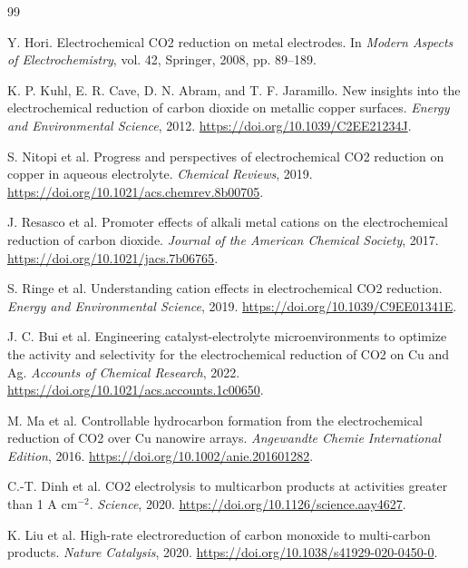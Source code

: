 \documentclass[11pt]{article}
\begin{document}
\begin{thebibliography}{99}

Y. Hori.
\newblock Electrochemical CO2 reduction on metal electrodes.
\newblock In \emph{Modern Aspects of Electrochemistry}, vol. 42, Springer, 2008, pp. 89--189.

K. P. Kuhl, E. R. Cave, D. N. Abram, and T. F. Jaramillo.
\newblock New insights into the electrochemical reduction of carbon dioxide on metallic copper surfaces.
\newblock \emph{Energy and Environmental Science}, 2012.
\newblock \url{https://doi.org/10.1039/C2EE21234J}.

S. Nitopi et al.
\newblock Progress and perspectives of electrochemical CO2 reduction on copper in aqueous electrolyte.
\newblock \emph{Chemical Reviews}, 2019.
\newblock \url{https://doi.org/10.1021/acs.chemrev.8b00705}.

J. Resasco et al.
\newblock Promoter effects of alkali metal cations on the electrochemical reduction of carbon dioxide.
\newblock \emph{Journal of the American Chemical Society}, 2017.
\newblock \url{https://doi.org/10.1021/jacs.7b06765}.

S. Ringe et al.
\newblock Understanding cation effects in electrochemical CO2 reduction.
\newblock \emph{Energy and Environmental Science}, 2019.
\newblock \url{https://doi.org/10.1039/C9EE01341E}.

J. C. Bui et al.
\newblock Engineering catalyst-electrolyte microenvironments to optimize the activity and selectivity for the electrochemical reduction of CO2 on Cu and Ag.
\newblock \emph{Accounts of Chemical Research}, 2022.
\newblock \url{https://doi.org/10.1021/acs.accounts.1c00650}.

M. Ma et al.
\newblock Controllable hydrocarbon formation from the electrochemical reduction of CO2 over Cu nanowire arrays.
\newblock \emph{Angewandte Chemie International Edition}, 2016.
\newblock \url{https://doi.org/10.1002/anie.201601282}.

C.-T. Dinh et al.
\newblock CO2 electrolysis to multicarbon products at activities greater than 1 A cm$^{-2}$.
\newblock \emph{Science}, 2020.
\newblock \url{https://doi.org/10.1126/science.aay4627}.

K. Liu et al.
\newblock High-rate electroreduction of carbon monoxide to multi-carbon products.
\newblock \emph{Nature Catalysis}, 2020.
\newblock \url{https://doi.org/10.1038/s41929-020-0450-0}.


\end{thebibliography}
\end{document}
